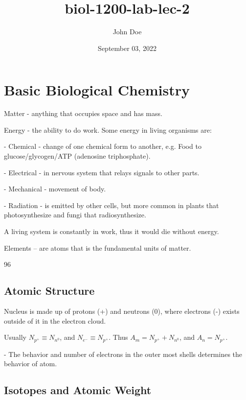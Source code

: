 \documentclass[12pt, UTF8]{article}
\title{biol-1200-lab-lec-2}
\author{John Doe}
\date{September 03, 2022}
\begin{document}
	\maketitle
	
	\section{Basic Biological Chemistry}
	
	Matter - anything that occupies space and has mass.
	
	Energy - the ability to do work. Some energy in living organisms are:
	
	- Chemical - change of one chemical form to another, e.g. Food to glucose/glycogen/ATP (adenosine triphosphate).
	
	- Electrical - in nervous system that relays signals to other parts.
	
	- Mechanical - movement of body.
	
	- Radiation - is emitted by other cells, but more common in plants that photosynthesize and fungi that radiosynthesize.
	
	A living system is constantly in work, thus it would die without energy.
	
	Elements -- are atoms that is the fundamental units of matter.
	
	96\\%
	
	\subsection*{Atomic Structure}
	
	Nucleus is made up of protons (+) and neutrons (0), where electrons (-) exists outside of it in the electron cloud.
	
	Usually $N_{p^{+}} \equiv N_{n^{0}}$, and $N_{e^{-}} \equiv N_{p^{+}}$. Thus $A_{m} = N_{p^{+}} + N_{n^{0}}$, and $A_{n} = N_{p^{+}}$.
	
	- The behavior and number of electrons in the outer most shells determines the behavior of atom.
	
	\subsection*{Isotopes and Atomic Weight}
	
\end{document}
